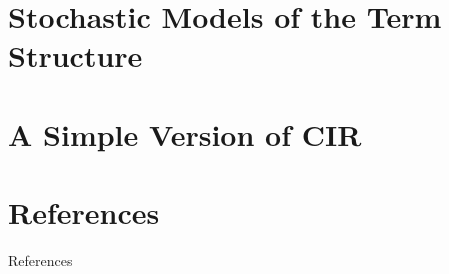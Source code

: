 \documentclass[
14pt,notheorems,hyperref={pdfauthor=whatever}
]{beamer}
\begin{document}
\section{Stochastic Models of the Term Structure}

\section{A Simple Version of CIR}

\section*{References}
\begin{frame}[allowframebreaks]{References}
    \printbibliography
\end{frame}
\end{document}
